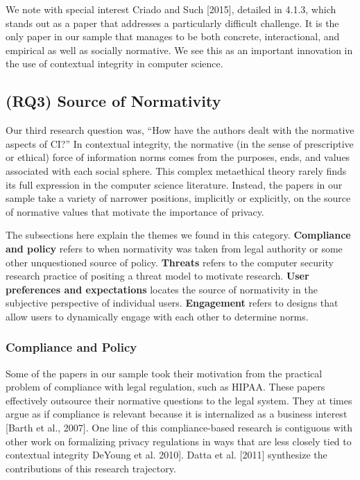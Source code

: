 \documentclass[../thesis.tex]{subfiles}
\begin{document}
We note with special interest Criado and Such [2015], detailed in 4.1.3,
which stands out as a paper that addresses a particularly difficult
challenge. It is the only paper in our sample that manages to be both
concrete, interactional, and empirical as well as socially normative.
We see this as an important innovation in the use of contextual
integrity in computer science.

\subsection{(RQ3) Source of Normativity}
\label{CI4.3}

Our third research question was, ``How have the authors
dealt with the normative aspects of CI?'' In
contextual integrity, the normative (in the sense of prescriptive or
ethical) force of information norms comes from the purposes, ends, and
values associated with each social sphere. This complex metaethical
theory rarely finds its full expression in the computer science
literature. Instead, the papers in our sample take a variety of
narrower positions, implicitly or explicitly, on the source of
normative values that motivate the importance of privacy.

The subsections here explain the themes we found in this category.
\textbf{Compliance and policy} refers to when normativity was taken
from legal authority or some other unquestioned source of policy.
\textbf{Threats} refers to the computer security research practice of
positing a threat model to motivate research. \textbf{User preferences
and expectations} locates the source of normativity in the subjective
perspective of individual users. \textbf{Engagement} refers to designs
that allow users to dynamically engage with each other to determine
norms.


\subsubsection{Compliance and Policy}
\label{CI4.3.1}

Some of the papers in our sample took their motivation from the
practical problem of compliance with legal regulation, such as HIPAA.
These papers effectively outsource their normative questions to the
legal system. They at times argue as if compliance is relevant because
it is internalized as a business interest [Barth et al., 2007]. One
line of this compliance-based research is contiguous with other work on
formalizing privacy regulations in ways that are less closely tied to
contextual integrity
DeYoung et al.
2010]. Datta et al. [2011] synthesize the contributions of this
research trajectory.
\end{document}
